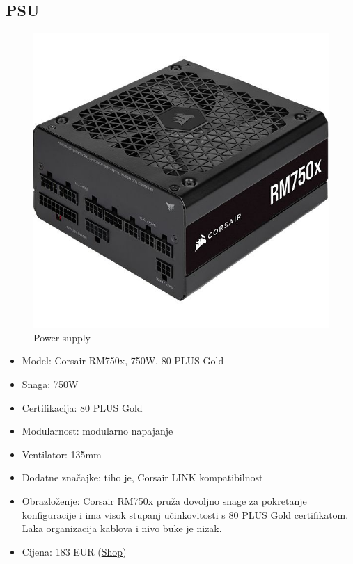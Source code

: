 \documentclass{article}
\begin{document}
\subsection{PSU}
\begin{figure}[H]
    \centering
    \includegraphics[width = \textwidth]{Slike/PSU.jpg}
    \caption{Power supply}
    \label{fig:PSU}
\end{figure}
\begin{itemize}
    \item Model: Corsair RM750x, 750W, 80 PLUS Gold
    \item Snaga: 750W
    \item Certifikacija: 80 PLUS Gold
    \item Modularnost: modularno napajanje
    \item Ventilator: 135mm 
    \item Dodatne značajke: tiho je, Corsair LINK kompatibilnost
    \item Obrazloženje: Corsair RM750x pruža dovoljno snage za pokretanje konfiguracije i ima visok stupanj učinkovitosti s 80 PLUS Gold certifikatom. Laka organizacija kablova i nivo buke je nizak.
    \item Cijena: 183 EUR (\href{https://www.instar-informatika.hr/napajanje-corsair-rm750x-750w-80-gold-modularno-atx/103917/product/}{Shop})
\end{itemize}
\end{document}
